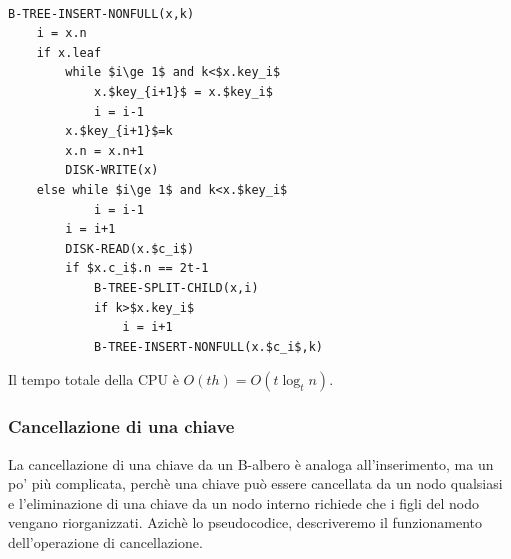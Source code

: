 \begin{lstlisting}[mathescape=true, caption=B-Tree insert nonfull]

B-TREE-INSERT-NONFULL(x,k)
	i = x.n
	if x.leaf
		while $i\ge 1$ and k<$x.key_i$
			x.$key_{i+1}$ = x.$key_i$
			i = i-1
		x.$key_{i+1}$=k
		x.n = x.n+1
		DISK-WRITE(x)
	else while $i\ge 1$ and k<x.$key_i$
			i = i-1
		i = i+1
		DISK-READ(x.$c_i$)
		if $x.c_i$.n == 2t-1
			B-TREE-SPLIT-CHILD(x,i)
			if k>$x.key_i$
				i = i+1
			B-TREE-INSERT-NONFULL(x.$c_i$,k)

\end{lstlisting}

Il tempo totale della CPU è $O(th)=O(t\log_tn)$.

\subsubsection{Cancellazione di una chiave}

La cancellazione di una chiave da un B-albero è analoga all'inserimento, ma un po' più complicata, perchè una chiave può essere cancellata da un nodo qualsiasi e l'eliminazione di una chiave da un nodo interno richiede che i figli del nodo vengano riorganizzati. Azichè lo pseudocodice, descriveremo il funzionamento dell'operazione di cancellazione.

